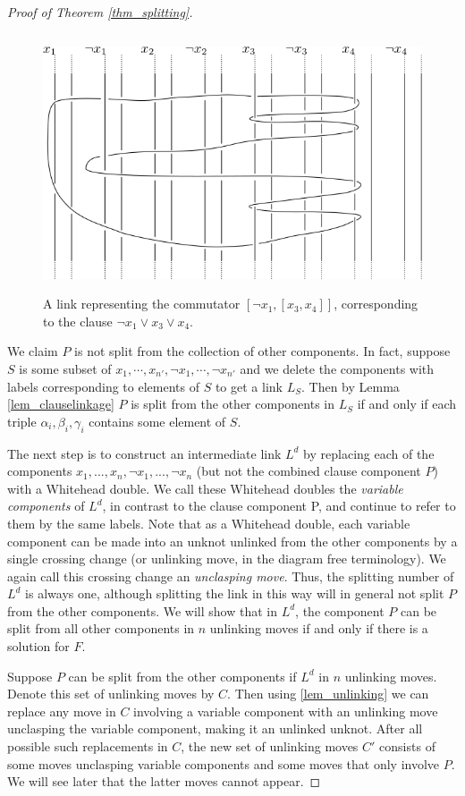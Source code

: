 \documentclass[12pt]{amsart}
\theoremstyle{definition}
\theoremstyle{remark}
\begin{document}
\begin{proof}[Proof of Theorem \ref{thm_splitting}]
\begin{figure}[ht]
\centering
\includegraphics[height=3in]{satclauseexample2.png}
\caption{A link representing the commutator $[\neg x_1,[x_3,x_4]]$, corresponding to the clause $ \neg x_1 \vee x_3 \vee x_4$.}
\label{fig_clauselink2}
\end{figure}

We claim $P$ is not split from the collection of other components.
In fact, suppose $S$ is some subset of $x_1, \cdots, x_{n'}, \neg x_1, \cdots , \neg x_{n'}$ and we delete the components with labels corresponding to elements of $S$ to get a link $L_S$.
Then by Lemma \ref{lem_clauselinkage} $P$ is split from the other components in $L_S$ if and only if each triple $\alpha_i,\beta_i,\gamma_i$ contains some element of $S$.

The next step is to construct an intermediate link $L^d$ by replacing each of the components $x_1, ..., x_n, \neg x_1, ..., \neg x_n$ (but not the combined clause component $P$) with a Whitehead double.
We call these Whitehead doubles the \emph{variable components} of $L^d$, in contrast to the clause component P, and continue to refer to them by the same labels.
Note that as a Whitehead double, each variable component can be made into an unknot unlinked from the other components by a single crossing change (or unlinking move, in the diagram free terminology).
We again call this crossing change an \emph{unclasping move}.
Thus, the splitting number of $L^d$ is always one, although splitting the link in this way will in general not split $P$ from the other components.
We will show that in $L^d$, the component $P$ can be split from all other components in $n$ unlinking moves if and only if there is a solution for $F$.

Suppose $P$ can be split from the other components if $L^d$ in $n$ unlinking moves.
Denote this set of unlinking moves by $C$.
Then using \ref{lem_unlinking} we can replace any move in $C$ involving a variable component with an unlinking move unclasping the variable component, making it an unlinked unknot.
After all possible such replacements in $C$, the new set of unlinking moves $C'$ consists of some moves unclasping variable components and some moves that only involve $P$.
We will see later that the latter moves cannot appear.


\end{proof}
\end{document}
